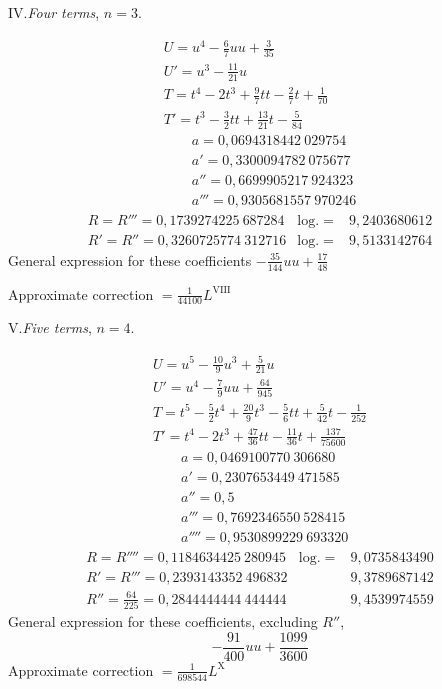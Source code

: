 \par{}\begin{center}IV.\quad\textit{Four terms}, \(n=3\).\end{center}
\[
\begin{array}{l}
U=u^4-\frac{6}{7}uu+\frac{3}{35}\\
U'=u^3-\frac{11}{21}u\\
T=t^4-2t^3+\frac{9}{7}tt-\frac{2}{7}t+\frac{1}{70}\\
T'=t^3-\frac{3}{2}tt+\frac{13}{21}t-\frac{5}{84}\\
\qquad a=0{,}0694318442\ 029754\\
\qquad a'=0{,}3300094782\ 075677\\
\qquad a''=0{,}6699905217\ 924323\\
\qquad a'''=0{,}9305681557\ 970246
\end{array}
\]
\[
\begin{array}{lll}
R=R'''=0{,}1739274225\ 687284&\mathrm{log.}=&9{,}2403680612\\
R'=R''=0{,}3260725774\ 312716&\mathrm{log.}=&9{,}5133142764
\end{array}
\]
\noindent General expression for these coefficients \(-\frac{35}{144}uu+\frac{17}{48}\)

\noindent Approximate correction \(=\frac{1}{44100}L^{\mathrm{VIII}}\)
\endgroup
{}
\begingroup\renewcommand{\arraystretch}{1.6}
\par{}\begin{center}V.\quad\textit{Five terms}, \(n=4\).\end{center}
\[
\begin{array}{l}
U=u^5-\frac{10}{9}u^3+\frac{5}{21}u\\
U'=u^4-\frac{7}{9}uu+\frac{64}{945}\\
T=t^5-\frac{5}{2}t^4+\frac{20}{9}t^3-\frac{5}{6}tt+\frac{5}{42}t-\frac{1}{252}\\
T'=t^4-2t^3+\frac{47}{36}tt-\frac{11}{36}t+\frac{137}{75600}\\
\qquad a=0{,}0469100770\ 306680\\
\qquad a'=0{,}2307653449\ 471585\\
\qquad a''=0{,}5\\
\qquad a'''=0{,}7692346550\ 528415\\
\qquad a''''=0{,}9530899229\ 693320
\end{array}
\]
\[
\begin{array}{lll}
R=R''''=0{,}1184634425\ 280945&\mathrm{log.}=&9{,}0735843490\\
R'=R'''=0{,}2393143352\ 496832&&9{,}3789687142\\
R''=\frac{64}{225}=0{,}2844444444\ 444444&&9{,}4539974559
\end{array}
\]
\noindent General expression for these coefficients, excluding \(R''\),
\[
-\frac{91}{400}uu+\frac{1099}{3600}
\]
\noindent Approximate correction \(=\frac{1}{698544}L^{\mathrm{X}}\)

